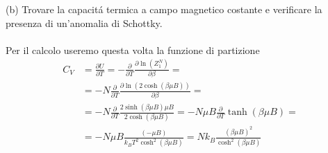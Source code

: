 \documentclass[a4paper]{article}
\begin{document}
        (b) Trovare la capacit\'a termica a campo magnetico costante e verificare la presenza di un'anomalia di Schottky.
        \\
        \\
        Per il calcolo useremo questa volta la funzione di partizione
        \begin{equation*}
            \begin{split}
                C_V&=\frac{\partial U}{\partial T}=-\frac{\partial}{\partial T}\frac{\partial \ln(Z_1^N)}{\partial \beta}=\\
                &=-N\frac{\partial}{\partial T}\frac{\partial \ln(2\cosh(\beta\mu B))}{\partial \beta}=\\
                &=-N\frac{\partial}{\partial T}\frac{2\sinh(\beta\mu B)\mu B}{2\cosh(\beta\mu B)}=-N\mu B\frac{\partial}{\partial T}\tanh(\beta\mu B)=\\
                &=-N\mu B\frac{(-\mu B)}{k_BT^2\cosh^2(\beta\mu B)}=Nk_B\frac{(\beta\mu B)^2}{\cosh^2(\beta\mu B)}\\
            \end{split}
        \end{equation*}
        \begin{center}
        \end{center}
    
\end{document}
